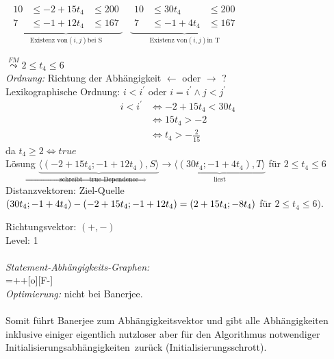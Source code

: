 $\begin{array}{cc}
\underbrace{
\begin{array}{ccc}
10 &\leq -2+15t_4 &\leq 200 \\
7  &\leq -1+12t_4 &\leq 167
\end{array}
}_{\text{Existenz von} (i,j) \text{bei S}} &
\underbrace{
\begin{array}{ccc}
10 &\leq 30t_4 &\leq 200 \\
 7 &\leq-1+4t_4 &\leq 167
\end{array}
}_{\text{Existenz von} (i,j) \text{in T}}

\end{array}$

$\stackrel{FM}{\leadsto} 2 \leq t_4 \leq 6$
~\\
\textit{Ordnung:} Richtung der Abhängigkeit $\leftarrow$ oder $\rightarrow$ ?\\

Lexikographische Ordnung: $i < i^\prime$ oder $i = i^\prime \land j < j^\prime$\\
\begin{equation}
\begin{split}
i<i^\prime &\Leftrightarrow -2+15t_4 < 30t_4\\
           &\Leftrightarrow    15t_4 > -2\\
           &\Leftrightarrow      t_4 >-\frac{2}{15}
\end{split}
\end{equation}
da $t_4 \geq 2 \Leftrightarrow true$\\
Lösung $\underbrace{\langle (-2 + 15t_4; -1+12t_4), S \rangle}_{\text{schreibt} \Rightarrow \text{true Dependence}} \rightarrow
 \underbrace{\langle (30t_4;-1+4t_4), T \rangle}_{\text{liest}}$ für $2 \leq t_4 \leq 6$\\

Distanzvektoren: \glqq Ziel-Quelle\grqq\\
$(30t_4; -1+4t_4) - (-2+15t_4; -1+12t_4) =\\
(2+15t_4; -8t_4)$ für $2\leq t_4 \leq 6)$.

Richtungsvektor: $(+,-)$\\
Level: 1\\
~\\
\textit{Statement-Abhängigkeits-Graphen:}\\

\entrymodifiers={++[o][F-]}
~\\
\textit{Optimierung:} nicht bei Banerjee.\\
~\\
Somit führt Banerjee zum Abhängigkeitsvektor und gibt alle Abhängigkeiten inklusive einiger eigentlich nutzloser aber für den Algorithmus notwendiger \glqq Initialisierungsabhängigkeiten\grqq\ zurück (Initialisierungsschrott).
